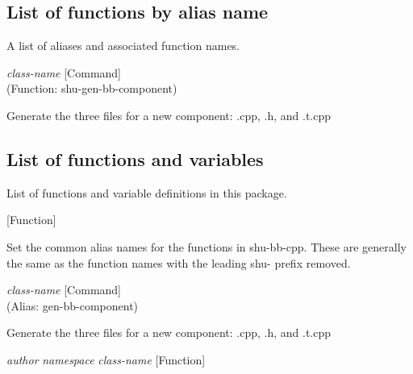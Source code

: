 \subsection{List of functions by alias name}

A list of aliases and associated function names.



\vspace{1em}
\noindent
{}
\usebox{\funcname}\emph{class-name}
 \hfill [Command]\\%
 (Function: shu-gen-bb-component)

\begin{doc-string}
Generate the three files for a new component: .cpp, .h, and .t.cpp
\end{doc-string}

\subsection{List of functions and variables}

List of functions and variable definitions in this package.



\vspace{1em}
\noindent
{}
\usebox{\funcname}
 \hfill [Function]

\begin{doc-string}
Set the common alias names for the functions in shu-bb-cpp.
These are generally the same as the function names with the leading
shu- prefix removed.
\end{doc-string}

\vspace{1em}
\noindent
{}
\usebox{\funcname}\emph{class-name}
 \hfill [Command]\\%
 (Alias: gen-bb-component)

\begin{doc-string}
Generate the three files for a new component: .cpp, .h, and .t.cpp
\end{doc-string}

\vspace{1em}
\noindent
{}
\usebox{\funcname}\emph{author} \emph{namespace} \emph{class-name}
 \hfill [Function]

